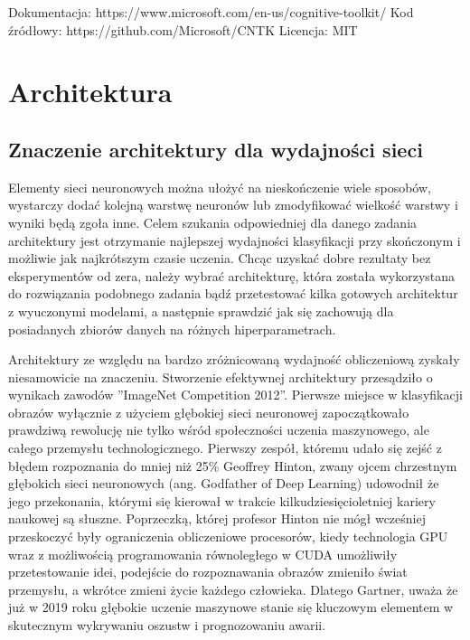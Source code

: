 \documentclass[12pt,a4paper,twoside,titlepage,openright]{book}
\begin{document}
\noindent
\newline
Dokumentacja: https://www.microsoft.com/en-us/cognitive-toolkit/
\newline
Kod źródłowy: https://github.com/Microsoft/CNTK
\newline
Licencja: MIT



\chapter{Architektura}
\section{Znaczenie architektury dla wydajności sieci}
Elementy sieci neuronowych można ułożyć na nieskończenie wiele sposobów, wystarczy dodać kolejną warstwę neuronów lub zmodyfikować wielkość warstwy i wyniki będą zgoła inne. Celem szukania odpowiedniej dla danego zadania architektury jest otrzymanie najlepszej wydajności klasyfikacji przy skończonym i możliwie jak najkrótszym czasie uczenia. Chcąc uzyskać dobre rezultaty bez eksperymentów od zera, należy wybrać architekturę, która została wykorzystana do rozwiązania podobnego zadania bądź przetestować kilka gotowych architektur z wyuczonymi modelami, a następnie sprawdzić jak się zachowują dla posiadanych zbiorów danych na różnych hiperparametrach.

Architektury ze względu na bardzo zróżnicowaną wydajność obliczeniową zyskały niesamowicie na znaczeniu. Stworzenie efektywnej architektury przesądziło o wynikach zawodów ''ImageNet Competition 2012''. Pierwsze miejsce w klasyfikacji obrazów wyłącznie z użyciem głębokiej sieci neuronowej zapoczątkowało prawdziwą rewolucję nie tylko wśród społeczności uczenia maszynowego, ale całego przemysłu technologicznego. Pierwszy zespół, któremu udało się zejść z błędem rozpoznania do mniej niż 25\% Geoffrey Hinton, zwany ojcem chrzestnym głębokich sieci neuronowych (ang. Godfather of Deep Learning) udowodnił że jego przekonania, którymi się kierował w trakcie kilkudziesięcioletniej kariery naukowej są słuszne. Poprzeczką, której profesor Hinton nie mógł wcześniej przeskoczyć były ograniczenia obliczeniowe procesorów, kiedy technologia GPU wraz z możliwością programowania równoległego w CUDA umożliwiły przetestowanie idei, podejście do rozpoznawania obrazów zmieniło świat przemysłu, a wkrótce zmieni życie każdego człowieka. Dlatego Gartner, uważa że już w 2019 roku głębokie uczenie maszynowe stanie się kluczowym elementem w skutecznym wykrywaniu oszustw i prognozowaniu awarii.\cite{siteGartner2019}
\end{document}
